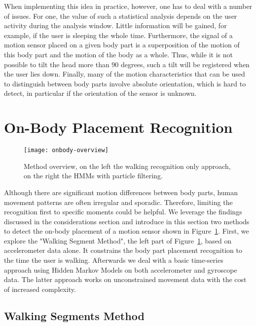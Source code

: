 When implementing this idea in practice, however, one has to deal with
a number of issues. For one, the value of such a statistical analysis
depends on the user activity during the analysis window. Little
information will be gained, for example, if the user is sleeping the
whole time. Furthermore, the signal of a motion sensor placed on a
given body part is a superposition of the motion of this body part and
the motion of the body as a whole. Thus, while it is not possible to
tilt the head more than 90 degrees, such a tilt will be registered
when the user lies down. Finally, many of the motion characteristics
that can be used to distinguish between body parts involve absolute
orientation, which is hard to detect, in particular if the orientation
of the sensor is unknown.


\section{On-Body Placement Recognition} 

\begin{figure}[!t]
\centering
\texttt{[image: onbody-overview]}
\caption[On-body placement detection method]{Method overview, on the left the walking recognition only
  approach, on the right the HMMs with particle
  filtering.}  \label{fig:onbody-overview} \end{figure}

Although there are significant motion differences between body parts, human movement patterns are often 
irregular and sporadic. Therefore, limiting the recognition first to specific moments could be helpful.
We leverage the findings discussed in the considerations section and introduce in
this section two methods to detect the on-body placement of a motion
sensor shown in Figure~\ref{fig:onbody-overview}.  First, we explore
the "Walking Segment Method", the left part of
Figure~\ref{fig:onbody-overview}, based on accelerometer data alone.
It constrains the body part placement recognition to the time the user
is walking.  Afterwards we deal with a
basic time-series approach using Hidden Markov Models on both
accelerometer and gyroscope data. The latter approach works on unconstrained movement data
with the cost of increased complexity.

\subsection{Walking Segments Method}

